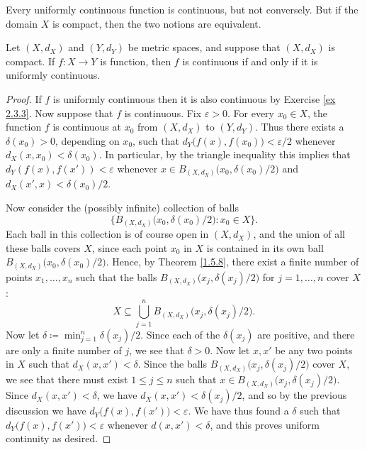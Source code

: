 \begin{note}
    Every uniformly continuous function is continuous, but not conversely.
    But if the domain \(X\) is compact, then the two notions are equivalent.
\end{note}

\begin{theorem}\label{2.3.5}
    Let \((X, d_X)\) and \((Y, d_Y)\) be metric spaces, and suppose that \((X, d_X)\) is compact.
    If \(f : X \to Y\) is function, then \(f\) is continuous if and only if it is uniformly continuous.
\end{theorem}

\begin{proof}
    If \(f\) is uniformly continuous then it is also continuous by Exercise \ref{ex 2.3.3}.
    Now suppose that \(f\) is continuous.
    Fix \(\varepsilon > 0\).
    For every \(x_0 \in X\), the function \(f\) is continuous at \(x_0\) from \((X, d_X)\) to \((Y, d_Y)\).
    Thus there exists a \(\delta(x_0) > 0\), depending on \(x_0\), such that \(d_Y\big(f(x), f(x_0)\big) < \varepsilon / 2\) whenever \(d_X(x, x_0) < \delta(x_0)\).
    In particular, by the triangle inequality this implies that \(d_Y(f(x), f(x')) < \varepsilon\) whenever \(x \in B_{(X, d_X)}\big(x_0, \delta(x_0) / 2\big)\) and \(d_X(x', x) < \delta(x_0) / 2\).

    Now consider the (possibly infinite) collection of balls
    \[
        \Big\{B_{(X, d_X)}\big(x_0, \delta(x_0) / 2\big) : x_0 \in X\Big\}.
    \]
    Each ball in this collection is of course open in \((X, d_X)\), and the union of all these balls covers \(X\), since each point \(x_0\) in \(X\) is contained in its own ball \(B_{(X, d_X)}\big(x_0, \delta(x_0) / 2\big)\).
    Hence, by Theorem \ref{1.5.8}, there exist a finite number of points \(x_1, \dots, x_n\) such that the balls \(B_{(X, d_X)}\big(x_j, \delta(x_j) / 2\big)\) for \(j = 1, \dots, n\) cover \(X\):
    \[
        X \subseteq \bigcup_{j = 1}^n B_{(X, d_X)}\big(x_j, \delta(x_j) / 2\big).
    \]
    Now let \(\delta \coloneqq \min_{j = 1}^n \delta(x_j) / 2\).
    Since each of the \(\delta(x_j)\) are positive, and there are only a finite number of \(j\), we see that \(\delta > 0\).
    Now let \(x, x'\) be any two points in \(X\) such that \(d_X(x, x') < \delta\).
    Since the balls \(B_{(X, d_X)}\big(x_j, \delta(x_j) / 2\big)\) cover \(X\), we see that there must exist \(1 \leq j \leq n\) such that \(x \in B_{(X, d_X)}\big(x_j, \delta(x_j) / 2\big)\).
    Since \(d_X(x, x') < \delta\), we have \(d_X(x, x') < \delta(x_j) / 2\), and so by the previous discussion we have \(d_Y\big(f(x), f(x')\big) < \varepsilon\).
    We have thus found a \(\delta\) such that \(d_Y\big(f(x), f(x')\big) < \varepsilon\) whenever \(d(x, x') < \delta\), and this proves uniform continuity as desired.
\end{proof}

